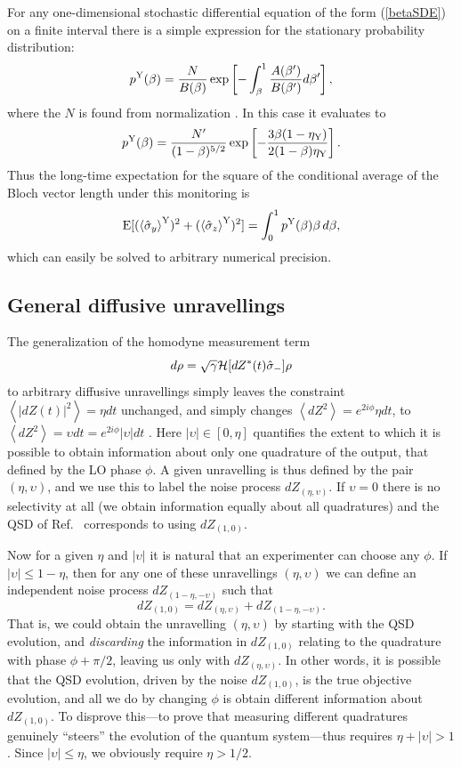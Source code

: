 \documentclass[12pt,prl,floatfix,showpacs,superscriptaddress,amsmath,amssymb]{revtex4}
\newcommand{\beq}{\begin{equation}}
\newcommand{\eeq}{\end{equation}}
\renewcommand{\(}{\left(}
\renewcommand{\)}{\right)}
\newcommand{\sq}[1]{\left[ {#1} \right]}
\newcommand{\an}[1]{\left\langle{#1}\right\rangle}
\renewcommand{\d}{^{\rm Y}}
\newcommand{\s}[1]{\hat \sigma_{#1}}
\begin{document}
{\begin{widetext}
 For any one-dimensional stochastic differential equation of the form (\ref{betaSDE}) on a finite interval  
 there is a simple expression for the stationary probability distribution: 
 \beq
 p\d(\beta) = \frac{N}{B(\beta)}\exp\sq{-\int_\beta^1  \frac{A(\beta')}{B(\beta')}d\beta'},
 \eeq
 where the $N$ is found from normalization \cite{Gar85}. 
In this case it evaluates to 
 \beq
 p\d(\beta) = \frac{N'}{ (1-\beta)^{5/2}}\exp\sq{-\frac{3 \beta(1-\eta_{\rm Y})}{2(1-\beta)\eta_{\rm Y}}}.
 \eeq
Thus the long-time expectation for the square of the conditional average of the Bloch vector length under this monitoring is
\beq \label{avbeta}
{\rm E}[(\an{\s{y}}\d)^2 + (\an{\s{z}}\d)^2] = \int_0^1 p\d(\beta) \beta \, d\beta ,\eeq
which can easily be solved to arbitrary numerical precision. 
 
\subsection*{\large General diffusive unravellings} 

The generalization of the homodyne measurement term 
\beq
d\rho = \sqrt{\gamma}{\cal H}[ dZ^*(t) \s{-}]\rho
\eeq
 to arbitrary diffusive unravellings simply leaves the constraint $\an{ |dZ(t)|^2}= \eta dt$ unchanged, and simply 
 changes  $\an{ dZ^2} = e^{2i\phi}\eta dt$,  to $\an{ dZ^2} = \upsilon dt = e^{2i\phi}|\upsilon|dt$ \cite{WisMil10}. Here $|\upsilon|\in [0,\eta]$  quantifies the extent to which it is possible to obtain information about only one quadrature of the output, 
that defined by the LO phase $\phi$. A given unravelling is thus defined by the pair $(\eta,\upsilon)$, and we use this to label the noise process $dZ_{(\eta,\upsilon)}$. If $\upsilon=0$ there is no selectivity at all (we obtain information equally about all quadratures) and the QSD of Ref.~\cite{GisPer92b} corresponds to using $dZ_{(1,0)}$.  

Now for a given $\eta$ and $|\upsilon|$ it is natural that an experimenter can choose any $\phi$.
If $|\upsilon| \leq 1-\eta$, then for any one of these unravellings $(\eta,\upsilon)$ we can define an independent noise process $dZ_{(1-\eta,-\upsilon)}$ such that
\beq
dZ_{(1,0)} = dZ_{(\eta,\upsilon)} + dZ_{(1-\eta,-\upsilon)}.
\eeq
That is, we could obtain the unravelling $(\eta,\upsilon)$ by starting with the QSD evolution, and {\em discarding} the information in $dZ_{(1,0)}$ relating to the quadrature with phase $\phi + \pi/2$, leaving us only with $dZ_{(\eta,\upsilon)}$. In other words, it is possible that the QSD evolution, driven by the noise $dZ_{(1,0)}$, is the true objective evolution, and all we do by changing $\phi$ is obtain different information about $dZ_{(1,0)}$. To disprove this---to prove that measuring different quadratures genuinely ``steers'' the evolution of the quantum system---thus requires 
$\eta + |\upsilon| > 1$. Since $|\upsilon|\leq \eta$, we  obviously require $\eta>1/2$. 


\end{widetext}}
\end{document}
